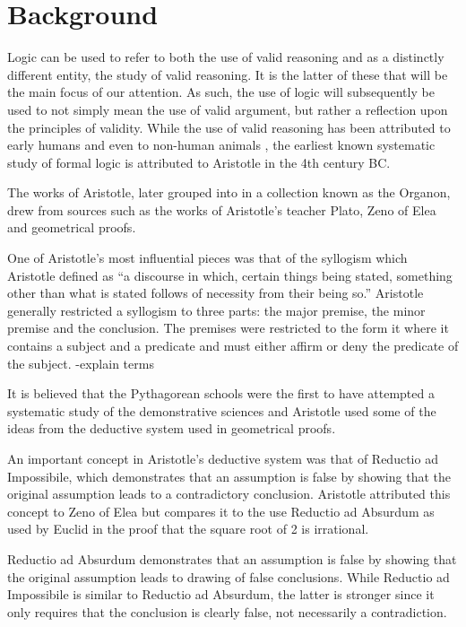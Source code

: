 \nocite{*}
\section{Background}

Logic can be used to refer to both the use of valid reasoning and as a distinctly different entity, the study of valid reasoning. It is the latter of these that will be the main focus of our attention. As such, the use of logic will subsequently be used to not simply mean the use of valid argument, but rather a reflection upon the principles of validity. While the use of valid reasoning has been attributed to early humans and even to non-human animals \cite{wolfgang1999mentality}, the earliest known systematic study of formal logic is attributed to Aristotle in the 4th century BC. \cite[p.~300]{salmon2007introduction}

The works of Aristotle, later grouped into in a collection known as the Organon, drew from sources such as the works of Aristotle’s teacher Plato, Zeno of Elea and geometrical proofs. \cite{KingShapiro95} 

One of Aristotle's most influential pieces was that of the syllogism which Aristotle defined as ``a discourse in which, certain things being stated, something other than what is stated follows of necessity from their being so.'' \cite[p.~4]{aristotle2004prior} Aristotle generally restricted a syllogism to three parts: the major premise, the minor premise and the conclusion. The premises were restricted to the form it where it contains a subject and a predicate and must either affirm or deny the predicate of the subject. \cite{sep-aristotle-logic}
-explain terms


It is believed that the Pythagorean schools were the first to have attempted a systematic study of the demonstrative sciences and Aristotle used some of the ideas from the deductive system used in geometrical proofs. \cite[p.~3]{kneale1962developments}

 An important concept in Aristotle's deductive system was that of Reductio ad Impossibile, which demonstrates that an assumption is false by showing that the original assumption leads to a contradictory conclusion. Aristotle attributed this concept to Zeno of Elea but compares it to the use Reductio ad Absurdum as used by Euclid in the proof that the square root of 2 is irrational.\cite[p.~8]{kneale1962developments}

Reductio ad Absurdum demonstrates that an assumption is false by showing that the original assumption leads to drawing of false conclusions. While Reductio ad Impossibile is similar to Reductio ad Absurdum, the latter is stronger since it only requires that the conclusion is clearly false, not necessarily a contradiction. \cite[p.~9]{kneale1962developments}



